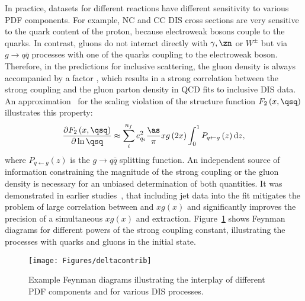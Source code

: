 In practice, datasets for different reactions have different sensitivity to various PDF components. For example, NC and CC DIS cross sections are very sensitive to the quark content of the proton, because electroweak bosons couple to the quarks. In contrast, gluons do not interact directly with $\gamma,\zn$ or $W^{\pm}$ but via $g\rightarrow q\bar q$ processes with one of the quarks coupling to the electroweak boson. Therefore, in the predictions for inclusive \ep scattering, the gluon density is always accompanied by a factor \as, which results in a strong correlation between the strong coupling and the gluon parton density in QCD fits to inclusive DIS data. An approximation~\cite{Prytz:1993vr} for the scaling violation of the structure function $F_2\left(x,\qsq \right)$ illustrates this property:
\begin{equation}
 \frac{\partial F_2\left(x,\qsq \right)}{\partial \ln \qsq} \approx \sum_i^{n_f}e_{q_i}^2 \frac{\as}{\pi} xg\left(2x\right) \int_0^1 P_{q\leftarrow g}\left(z\right)\mathrm{d}z, 
\end{equation}
where $P_{q\leftarrow g}\left(z\right)$ is the $g\rightarrow q\bar q$ splitting function. An independent source of information constraining the magnitude of the strong coupling or the gluon density is necessary for an unbiased determination of both quantities. It was demonstrated in earlier studies~\cite{Chekanov:2005nn,upub:herapdf1.7}, that including jet data into the fit mitigates the problem of large correlation between \as and $xg\left(x\right)$ and significantly improves the precision of a simultaneous $xg\left(x\right)$ and \as extraction. Figure~\ref{fig:pdfcontributions} shows Feynman diagrams for different powers of the strong coupling constant, illustrating the processes with quarks and gluons in the initial state.
\begin{figure}[htp]
 \centering
 \begin{center}
 \texttt{[image: Figures/deltacontrib]}
\end{center}
 \caption{Example Feynman diagrams illustrating the interplay of different PDF components and \as for various DIS processes.}
 \label{fig:pdfcontributions}
\end{figure}
